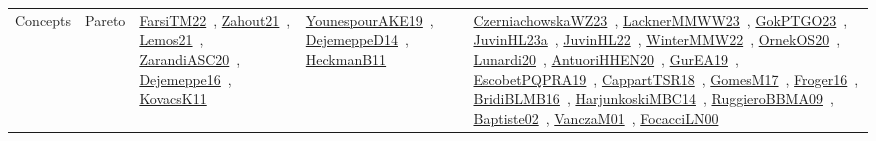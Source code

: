 {\begin{longtable}{lp{3cm}>{\raggedright\arraybackslash}p{6cm}>{\raggedright\arraybackslash}p{6cm}>{\raggedright\arraybackslash}p{8cm}}
Concepts & Pareto & \href{../works/FarsiTM22.pdf}{FarsiTM22}~\cite{FarsiTM22}, \href{../works/Zahout21.pdf}{Zahout21}~\cite{Zahout21}, \href{../works/Lemos21.pdf}{Lemos21}~\cite{Lemos21}, \href{../works/ZarandiASC20.pdf}{ZarandiASC20}~\cite{ZarandiASC20}, \href{../works/Dejemeppe16.pdf}{Dejemeppe16}~\cite{Dejemeppe16}, \href{../works/KovacsK11.pdf}{KovacsK11}~\cite{KovacsK11} & \href{../works/YounespourAKE19.pdf}{YounespourAKE19}~\cite{YounespourAKE19}, \href{../works/DejemeppeD14.pdf}{DejemeppeD14}~\cite{DejemeppeD14}, \href{../works/HeckmanB11.pdf}{HeckmanB11}~\cite{HeckmanB11} & \href{../works/CzerniachowskaWZ23.pdf}{CzerniachowskaWZ23}~\cite{CzerniachowskaWZ23}, \href{../works/LacknerMMWW23.pdf}{LacknerMMWW23}~\cite{LacknerMMWW23}, \href{../works/GokPTGO23.pdf}{GokPTGO23}~\cite{GokPTGO23}, \href{../works/JuvinHL23a.pdf}{JuvinHL23a}~\cite{JuvinHL23a}, \href{../works/JuvinHL22.pdf}{JuvinHL22}~\cite{JuvinHL22}, \href{../works/WinterMMW22.pdf}{WinterMMW22}~\cite{WinterMMW22}, \href{../works/OrnekOS20.pdf}{OrnekOS20}~\cite{OrnekOS20}, \href{../works/Lunardi20.pdf}{Lunardi20}~\cite{Lunardi20}, \href{../works/AntuoriHHEN20.pdf}{AntuoriHHEN20}~\cite{AntuoriHHEN20}, \href{../works/GurEA19.pdf}{GurEA19}~\cite{GurEA19}, \href{../works/EscobetPQPRA19.pdf}{EscobetPQPRA19}~\cite{EscobetPQPRA19}, \href{../works/CappartTSR18.pdf}{CappartTSR18}~\cite{CappartTSR18}, \href{../works/GomesM17.pdf}{GomesM17}~\cite{GomesM17}, \href{../works/Froger16.pdf}{Froger16}~\cite{Froger16}, \href{../works/BridiBLMB16.pdf}{BridiBLMB16}~\cite{BridiBLMB16}, \href{../works/HarjunkoskiMBC14.pdf}{HarjunkoskiMBC14}~\cite{HarjunkoskiMBC14}, \href{../works/RuggieroBBMA09.pdf}{RuggieroBBMA09}~\cite{RuggieroBBMA09}, \href{../works/Baptiste02.pdf}{Baptiste02}~\cite{Baptiste02}, \href{../works/VanczaM01.pdf}{VanczaM01}~\cite{VanczaM01}, \href{../works/FocacciLN00.pdf}{FocacciLN00}~\cite{FocacciLN00}\\

\end{longtable}}
